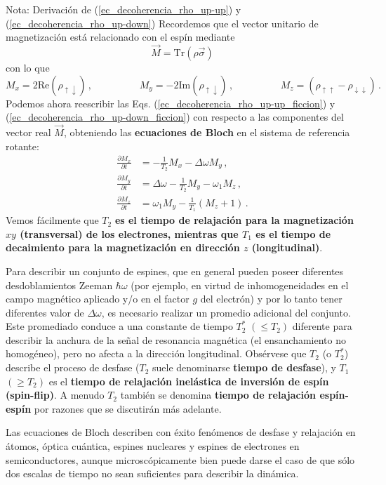 \documentclass[a4paper,11pt]{book} %
\numberwithin{equation}{chapter}
\def\lp{\left(}
\def\rp{\right)}
\begin{document}
\begin{mybox_blue}{Nota: Derivación de (\ref{ec_decoherencia_rho_up-up}) y  (\ref{ec_decoherencia_rho_up-down})}
Recordemos que el vector unitario de magnetización está relacionado con el espín mediante
	\begin{equation}
	\vec{M} = \text{Tr} \lp \rho \vec{\sigma} \rp
	\end{equation}
con lo que
	\begin{equation}
	M_x = 2 \text{Re} (\rho_{\uparrow \downarrow})\, , \hspace{2cm}
	M_y = -2 \text{Im}(\rho_{\uparrow \downarrow}) \, , \hspace{2cm}	
	M_z = (\rho_{\uparrow \uparrow} - \rho_{\downarrow \downarrow}) \,.
	\end{equation}
Podemos ahora reescribir las Eqs. (\ref{ec_decoherencia_rho_up-up_ficcion}) y (\ref{ec_decoherencia_rho_up-down_ficcion}) con respecto a las componentes del vector real $\vec{M}$, obteniendo las \textbf{ecuaciones de Bloch} en el sistema de referencia rotante:
	\begin{align}
	\frac{\partial M_x}{\partial t} & = - \frac{1}{T_2} M_x - \Delta\omega M_y \, , \\
	\frac{\partial M_y}{\partial t} & = \Delta\omega - \frac{1}{T_2} M_y - \omega_1 M_z\, , \\
	\frac{\partial M_z}{\partial t} & = \omega_1 M_y - \frac{1}{T_1} (M_z +1) \, .
	\end{align}
Vemos fácilmente que $T_2$ \textbf{es el tiempo de relajación para la magnetización $xy$ (transversal) de los electrones, mientras que $T_1$ es el tiempo de decaimiento para la magnetización en dirección $z$ (longitudinal)}. 

Para describir un conjunto de espines, que en general pueden poseer diferentes desdoblamientos Zeeman $\hbar \omega$ (por ejemplo, en virtud de inhomogeneidades en el campo magnético aplicado y/o en el factor $g$ del electrón) y por lo tanto tener diferentes valor de $\Delta\omega$, es necesario realizar un promedio adicional del conjunto. Este promediado conduce a una constante de tiempo $T^{*}_2$ $(\leq T_2)$ diferente para describir la anchura de la señal de resonancia magnética (el ensanchamiento no homogéneo), pero no afecta a la dirección longitudinal. Obsérvese que $T_2$ (o $T^{*}_2$) describe el proceso de desfase ($T_2$ suele denominarse \textbf{tiempo de desfase}), y $T_1$ $(\geq  T_2)$ es el \textbf{tiempo de relajación inelástica de inversión de espín (spin-flip)}. A menudo $T_2$ también se denomina \textbf{tiempo de relajación espín-espín} por razones que se discutirán más adelante. 

Las ecuaciones de Bloch describen con éxito fenómenos de desfase y relajación en átomos, óptica cuántica, espines nucleares y espines de electrones en semiconductores, aunque microscópicamente bien puede darse el caso de que sólo dos escalas de tiempo no sean suficientes para describir la dinámica. 


\end{mybox_blue}
\end{document}

